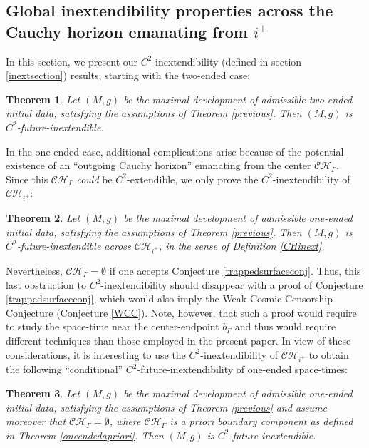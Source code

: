 \documentclass[10pt,a4paper]{article}
\theoremstyle{plain}
\newtheorem{thm}{Theorem}[section]
\theoremstyle{remark}
\theoremstyle{definition}
\theoremstyle{plain}
\theoremstyle{remark}
\theoremstyle{definition}
\newcommand{\CH}{\mathcal{CH}_{i^+}}
\numberwithin{equation}{section}
\begin{document}
\subsection{Global inextendibility properties across the Cauchy horizon emanating from $i^+$}
In this section, we present our $C^2$-inextendibility (defined in section \ref{inextsection}) results, starting with the two-ended case: 
\begin{thm} \label{conditionnalSCCtheoremtwoended}
	Let $(M,g)$ be the maximal development of admissible two-ended initial data, satisfying the assumptions of Theorem \ref{previous}. Then $(M,g)$ is $C^2$-future-inextendible.
	
	
\end{thm}
In the one-ended case, additional complications arise because of the potential existence of an ``outgoing Cauchy horizon'' emanating from the center $\mathcal{CH}_{\Gamma}$. Since this $\mathcal{CH}_{\Gamma}$ \textit{could} be $C^2$-extendible, we only prove the $C^2$-inextendibility of $\CH$:
\begin{thm} \label{CHinexttheorem}
	Let $(M,g)$ be the maximal development of admissible one-ended initial data, satisfying the assumptions of Theorem \ref{previous}. Then $(M,g)$ is $C^2$-future-inextendible across $\CH$, in the sense of Definition \ref{CHinext}.
\end{thm}
Nevertheless, $\mathcal{CH}_{\Gamma}=\emptyset$ if one accepts Conjecture \ref{trappedsurfaceconj}. Thus, this last obstruction to $C^2$-inextendibility should disappear with a proof of Conjecture \ref{trappedsurfaceconj}, which would also imply the Weak Cosmic Censorship Conjecture (Conjecture \ref{WCC}). Note, however, that such a proof would require to study the space-time near the center-endpoint $b_{\Gamma}$ and thus would require different techniques than those employed in the present paper. In view of these considerations, it is interesting to use the $C^2$-inextendibility of $\CH$ to obtain the following ``conditional'' $C^2$-future-inextendibility of one-ended space-times:
\begin{thm} \label{conditionnalSCCtheoremoneended}
	Let $(M,g)$ be the maximal development of admissible one-ended initial data, satisfying the assumptions of Theorem \ref{previous} and assume moreover that $\mathcal{CH}_{\Gamma} =\emptyset$, where $\mathcal{CH}_{\Gamma}$ is a priori boundary component as defined in Theorem \ref{oneendedapriori}. Then $(M,g)$ is $C^2$-future-inextendible.
\end{thm}
\end{document}
